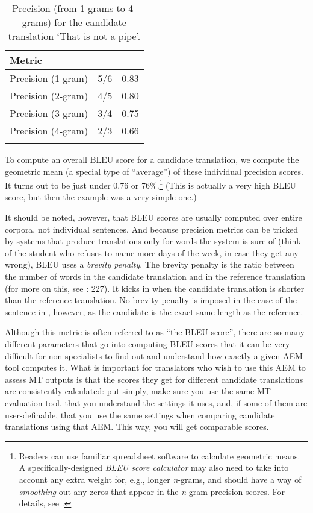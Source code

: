 \documentclass[output=paper]{langscibook}
\begin{document}
\begin{table}
\begin{tabular}{lrr}
\lsptoprule
{Metric} &  & \\
\midrule
Precision (1-gram) & 5/6 & 0.83\\
Precision (2-gram) & 4/5 & 0.80\\
Precision (3-gram) & 3/4 & 0.75\\
Precision (4-gram) & 2/3 & 0.66\\
\lspbottomrule
\end{tabular}
\caption{Precision (from 1-grams to 4-grams) for the candidate translation `That is not a pipe'\label{tab:rossi:12}.}
\end{table}

To compute an overall BLEU score for a candidate translation, we compute the geometric mean (a special type of “average”) of these individual precision scores. It turns out to be just under 0.76 or 76\%.\footnote{Readers can use familiar spreadsheet software to calculate geometric means. A specifically-designed \textit{BLEU score calculator} may also need to take into account any extra weight for, e.g., longer \textit{n}-grams, and should have a way of \textit{smoothing} out any zeros that appear in the \textit{n}-gram precision scores. For details, see \citet{Post2018}.} (This is actually a very high BLEU score, but then the example was a very simple one.)

It should be noted, however, that BLEU scores are usually computed over entire corpora, not individual sentences. And because precision metrics can be tricked by systems that produce translations only for words the system is sure of (think of the student who refuses to name more days of the week, in case they get any wrong), BLEU uses a \textit{brevity penalty}. The brevity penalty is the ratio between the number of words in the candidate translation and in the reference translation (for more on this, see \citealt{Koehn2020}: 227). It kicks in when the candidate translation is shorter than the reference translation. No brevity penalty is imposed in the case of the sentence in , however, as the candidate is the exact same length as the reference.

Although this metric is often referred to as “the BLEU score”, there are so many different parameters that go into computing BLEU scores \citep{Post2018} that it can be very difficult for non-specialists to find out and understand how exactly a given AEM tool computes it. What is important for translators who wish to use this AEM to assess MT outputs is that the scores they get for different candidate translations are consistently calculated: put simply, make sure you use the same MT evaluation tool, that you understand the settings it uses, and, if some of them are user-definable, that you use the same settings when comparing candidate translations using that AEM. This way, you will get comparable scores.
\end{document}
